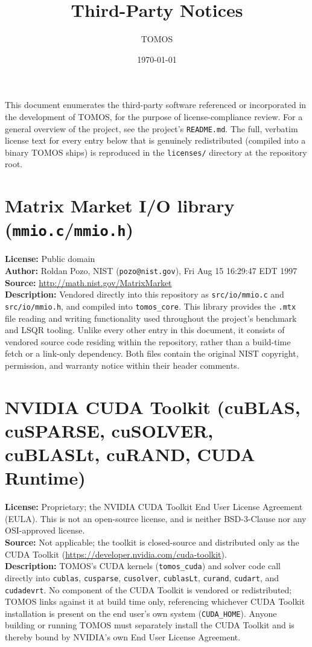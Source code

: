 \documentclass[11pt]{article}
\title{Third-Party Notices}
\author{TOMOS}
\date{\today}
\newcommand{\field}[2]{\noindent\textbf{#1:} #2\\}
\begin{document}
\maketitle

\noindent
This document enumerates the third-party software referenced or
incorporated in the development of TOMOS, for the purpose of
license-compliance review. For a general overview of the project, see the
project's \texttt{README.md}. The full, verbatim license text for every
entry below that is genuinely redistributed (compiled into a binary TOMOS
ships) is reproduced in the \texttt{licenses/} directory at the
repository root.

\section{Matrix Market I/O library (\texttt{mmio.c}/\texttt{mmio.h})}

\field{License}{Public domain}
\field{Author}{Roldan Pozo, NIST (\texttt{pozo@nist.gov}), Fri Aug 15 16:29:47 EDT 1997}
\field{Source}{\url{http://math.nist.gov/MatrixMarket}}

\noindent
\textbf{Description:} Vendored directly into this repository as
\texttt{src/io/mmio.c} and \texttt{src/io/mmio.h}, and compiled into
\texttt{tomos\_core}. This library provides the \texttt{.mtx} file reading
and writing functionality used throughout the project's benchmark and LSQR
tooling. Unlike every other entry in this document, it consists of vendored
source code residing within the repository, rather than a build-time fetch
or a link-only dependency. Both files contain the original NIST copyright,
permission, and warranty notice within their header comments.

\section{NVIDIA CUDA Toolkit (cuBLAS, cuSPARSE, cuSOLVER, cuBLASLt, cuRAND, CUDA Runtime)}

\field{License}{Proprietary; the NVIDIA CUDA Toolkit End User License Agreement (EULA). This is not an open-source license, and is neither BSD-3-Clause nor any OSI-approved license.}
\field{Source}{Not applicable; the toolkit is closed-source and distributed only as the CUDA Toolkit (\url{https://developer.nvidia.com/cuda-toolkit}).}

\noindent
\textbf{Description:} TOMOS's CUDA kernels (\texttt{tomos\_cuda}) and
solver code call directly into \texttt{cublas}, \texttt{cusparse},
\texttt{cusolver}, \texttt{cublasLt}, \texttt{curand}, \texttt{cudart}, and
\texttt{cudadevrt}. No component of the CUDA Toolkit is vendored or
redistributed; TOMOS links against it at build time only, referencing
whichever CUDA Toolkit installation is present on the end user's own
system (\texttt{CUDA\_HOME}). Anyone building or running TOMOS must
separately install the CUDA Toolkit and is thereby bound by NVIDIA's own
End User License Agreement.
\end{document}
